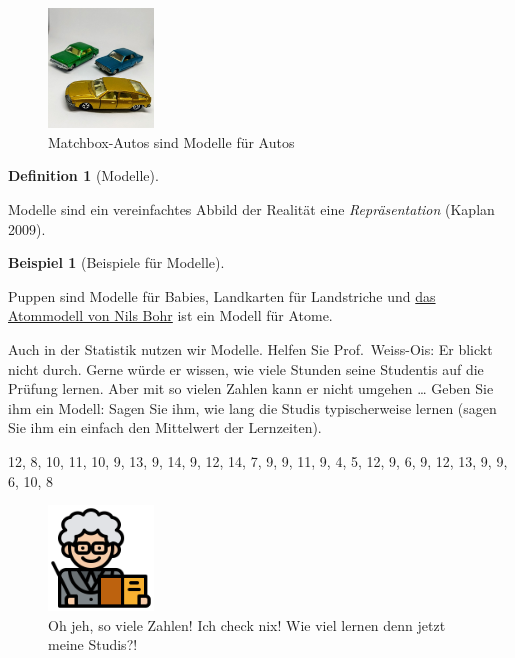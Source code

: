 \documentclass[
  a4paper,
  DIV=11]{scrreprt}
\theoremstyle{definition}
\newtheorem{definition}{Definition}[chapter]
\theoremstyle{definition}
\newtheorem{example}{Beispiel}[chapter]
\theoremstyle{remark}
\begin{document}
\begin{figure}

{\centering \includegraphics[width=0.25\textwidth,height=\textheight]{./img/matchbox.jpg}

}

\caption{\label{fig-matchbox}Matchbox-Autos sind Modelle für Autos}

\end{figure}

\leavevmode{}%
\begin{definition}[Modelle]\label{def-modelle}

Modelle sind ein vereinfachtes Abbild der Realität eine
\emph{Repräsentation} (Kaplan 2009).

\end{definition}

\leavevmode{}%
\begin{example}[Beispiele für Modelle]\label{exm-Modelle}

Puppen sind Modelle für Babies, Landkarten für Landstriche und
\href{https://de.wikipedia.org/wiki/Bohrsches_Atommodell}{das Atommodell
von Nils Bohr} ist ein Modell für Atome.

\end{example}

Auch in der Statistik nutzen wir Modelle. Helfen Sie Prof.~Weiss-Ois: Er
blickt nicht durch. Gerne würde er wissen, wie viele Stunden seine
Studentis auf die Prüfung lernen. Aber mit so vielen Zahlen kann er
nicht umgehen \ldots{} Geben Sie ihm ein Modell: Sagen Sie ihm, wie lang
die Studis typischerweise lernen (sagen Sie ihm ein einfach den
Mittelwert der Lernzeiten).

12, 8, 10, 11, 10, 9, 13, 9, 14, 9, 12, 14, 7, 9, 9, 11, 9, 4, 5, 12, 9,
6, 9, 12, 13, 9, 9, 6, 10, 8

\begin{figure}

{\centering \includegraphics[width=0.25\textwidth,height=\textheight]{./img/teacher.png}

}

\caption{Oh jeh, so viele Zahlen! Ich check nix! Wie viel lernen denn
jetzt meine Studis?!}

\end{figure}
\end{document}
